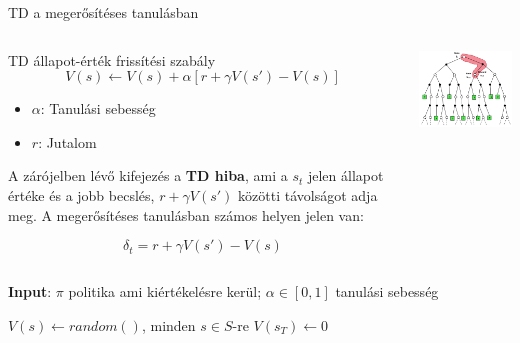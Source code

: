 \documentclass[english, aspectratio=169]{beamer}
\begin{document}
\begin{frame}{TD a megerősítéses tanulásban}
\begin{columns}
\begin{column}{.55\textwidth}
\begin{block}{TD állapot-érték frissítési szabály}
\vspace{-0.25cm}
\[
V(s) \leftarrow V(s) + \alpha \left[ r + \gamma V(s') - V(s) \right]
\]
\vspace{-0.75cm}
\begin{itemize}
	\item $\alpha$: Tanulási sebesség
	\item $r$: Jutalom
\end{itemize}
\end{block}
A zárójelben lévő kifejezés a \textbf{TD hiba}, ami a $s_t$ jelen állapot értéke és a jobb becslés, $r + \gamma V(s')$ közötti távolságot adja meg. A megerősítéses tanulásban számos helyen jelen van: 
\begin{block}{}
\vspace{-0.2cm}
\[
\delta_t=r + \gamma V(s') - V(s)
\]
\end{block}
\end{column}
\begin{column}{.5\textwidth}
\begin{center}
\includegraphics[width=7cm, keepaspectratio]{images/mc_td_8.png}
\end{center}
\end{column}
\end{columns}
\end{frame}

\begin{frame}{}
\begin{algorithm}[H]
\caption{TD algoritmus $V_\pi$ megbecslésére}
\SetAlgoLined
\textbf{Input}: $\pi$ politika ami kiértékelésre kerül; $\alpha \in [0,1]$ tanulási sebesség\par\smallskip
$V(s) \leftarrow random()$, minden $s \in S$-re
$V(s_T) \leftarrow 0$
\end{algorithm}
\end{frame}
\end{document}
